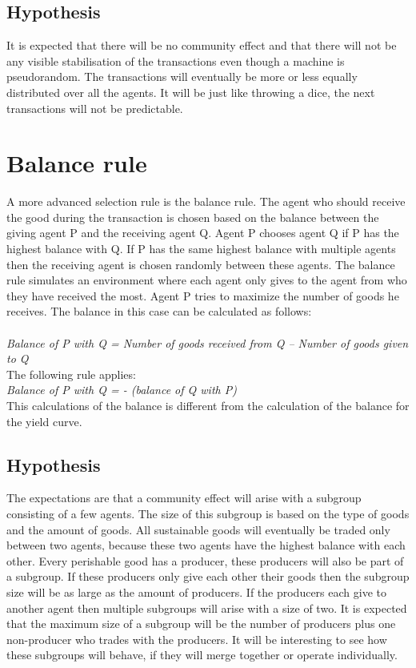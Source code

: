 \documentclass[twoside,openright]{uva-bachelor-thesis}
\begin{document}
\subsection{Hypothesis}
It is expected that there will be no community effect and that there will not be any visible stabilisation of the transactions even though a machine is pseudorandom. The transactions will eventually be more or less equally distributed over all the agents. It will be just like throwing a dice, the next transactions will not be predictable. 

\section{Balance rule}
A more advanced selection rule is the balance rule. The agent who should receive the good during the transaction is chosen based on the balance between the giving agent P and the receiving agent Q. Agent P chooses agent Q if P has the highest balance with Q. If P has the same highest balance with multiple agents then the receiving agent is chosen randomly between these agents. The balance rule simulates an environment where each agent only gives to the agent from who they have received the most. Agent P tries to maximize the number of goods he receives. The balance in this case can be calculated as follows: 
\\
\\
\textit{Balance of P with Q = Number of goods received from Q – Number of goods given to Q} \\
The following rule applies:\\
\textit{Balance of P with Q = - (balance of Q with P)}\\
This calculations of the balance is different from the calculation of the balance for the yield curve.\\




\subsection{Hypothesis}
The expectations are that a community effect will arise with a subgroup consisting of a few agents. The size of this subgroup is based on the type of goods and the amount of goods. All sustainable goods will eventually be traded only between two agents, because these two agents have the highest balance with each other. Every perishable good has a producer, these producers will also be part of a subgroup. If these producers only give each other their goods then the subgroup size will be as large as the amount of producers. If the producers each give to another agent then multiple subgroups will arise with a size of two. It is expected that the maximum size of a subgroup will be the number of producers plus one non-producer who trades with the producers. It will be interesting to see how these subgroups will behave, if they will merge together or operate individually.
\end{document}

